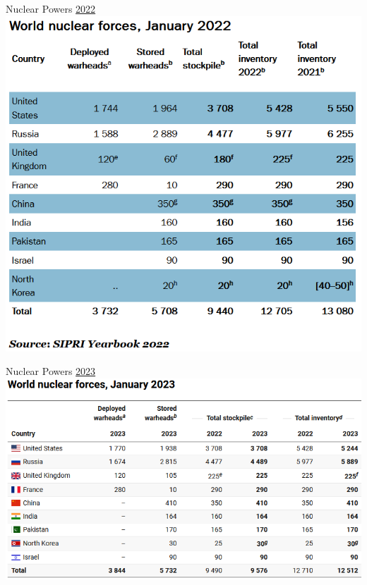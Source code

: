 \documentclass{beamer}
\begin{document}
\begin{frame}{\LARGE Nuclear Powers \href{https://www.sipri.org/media/press-release/2022/global-nuclear-arsenals-are-expected-grow-states-continue-modernize-new-sipri-yearbook-out-now}{2022}}
	\centering
	\includegraphics[width=\textwidth,height=0.9\textheight,keepaspectratio]{SIPRI2022nuclear.png}
\end{frame}

\begin{frame}{\LARGE Nuclear Powers \href{https://www.sipri.org/media/press-release/2023/states-invest-nuclear-arsenals-geopolitical-relations-deteriorate-new-sipri-yearbook-out-now}{2023}}
	\centering
	\includegraphics[width=\textwidth,height=0.9\textheight,keepaspectratio]{SIPRI2023nuclear.png}
\end{frame}
\end{document}
